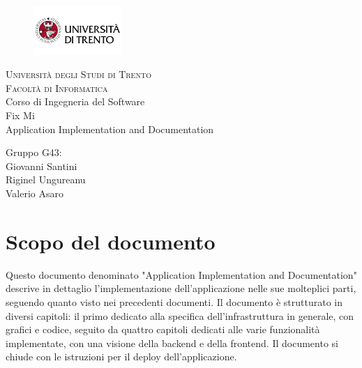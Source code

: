 \documentclass{report}
\begin{document}
	
	
	\begin{titlepage}
		\begin{figure}[t]
			\centering\includegraphics[width=0.3\textwidth]{images/unitn-logo}
		\end{figure}
		\begin{center}
			\textsc{ \LARGE{Università degli Studi di Trento \\}}
			\textsc{ \LARGE{Facoltà di Informatica\\ }}
			\textnormal{ \LARGE{Corso di Ingegneria del Software\\}}
			\vspace{30mm}
			\fontsize{10mm}{7mm}\selectfont 
			\textup{Fix Mi \\ Application Implementation and Documentation}\\
		\end{center}
		
		\vspace{25mm}
		
		\centering
		\large Gruppo G43: \\ Giovanni Santini\\ Riginel Ungureanu \\ Valerio Asaro
		
		\vspace{20mm}
		
		
	\end{titlepage}
	
	
	
	
	\pagestyle{fancy}
	\fancyhead[R]{\chaptername\ \thechapter}  %
	
	\tableofcontents
	\newpage
	
	
	
	\section{Scopo del documento}
	Questo documento denominato "Application Implementation and Documentation" descrive in dettaglio l'implementazione dell'applicazione nelle sue molteplici parti, seguendo quanto visto nei precedenti documenti. Il documento è strutturato in diversi capitoli: il primo dedicato alla specifica dell'infrastruttura in generale, con grafici e codice, seguito da quattro capitoli dedicati alle varie funzionalità implementate, con una visione della backend e della frontend. Il documento si chiude con le istruzioni per il deploy dell'applicazione.
	
\end{document}
